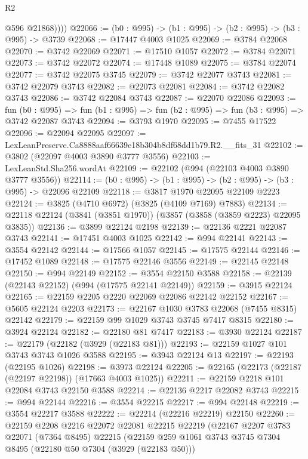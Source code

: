 \begin{lexlean}{R2}
\begin{coremodule}
            @596
            @21868))))
@22066 := (b0 : @995) -> (b1 : @995) -> (b2 : @995) -> (b3 : @995) -> @3739
@22068 := @17447 @4003 @1025
@22069 := @3784 @22068
@22070 := @3742 @22069
@22071 := @17510 @1057
@22072 := @3784 @22071
@22073 := @3742 @22072
@22074 := @17448 @1089
@22075 := @3784 @22074
@22077 := @3742 @22075 @3745
@22079 := @3742 @22077 @3743
@22081 := @3742 @22079 @3743
@22082 := @22073 @22081
@22084 := @3742 @22082 @3743
@22086 := @3742 @22084 @3743
@22087 := @22070 @22086
@22093 := fun (b0 : @995) =>
  fun (b1 : @995) => fun (b2 : @995) => fun (b3 : @995) => @3742 @22087 @3743
@22094 := @3793 @1970
@22095 := @7455 @17522
@22096 := @22094 @22095
@22097 := LexLeanPreserve.Ca8888aaf66639e18b304b8df68dd1b79.R2.__fits_31
@22102 := @3802 (@22097 @4003 @3890 @3777 @3556)
@22103 := LexLeanStd.Sha256.wordAt
@22109 := @22102 (@994 (@22103 @4003 @3890 @3777 @3556))
@22114 := (b0 : @995) -> (b1 : @995) -> (b2 : @995) -> (b3 : @995) -> @22096 @22109
@22118 := @3817 @1970 @22095 @22109 @2223
@22124 := @3825 (@4710 @6972) (@3825 (@4109 @7169) @7883)
@22134 := @22118 @22124 (@3841 (@3851 @1970)) (@3857 (@3858 (@3859 @2223) @22095 @3835))
@22136 := @3899 @22124 @2198
@22139 := @22136 @2221 @22087 @3743
@22141 := @17451 @4003 @1025
@22142 := @994 @22141
@22143 := @3554 @22142
@22144 := @17566 @1057
@22145 := @17575 @22144
@22146 := @17452 @1089
@22148 := @17575 @22146 @3556
@22149 := @22145 @22148
@22150 := @994 @22149
@22152 := @3554 @22150 @3588
@22158 := @22139 (@22143 @22152) (@994 (@17575 @22141 @22149))
@22159 := @3915 @22124
@22165 := @22159 @2205 @2220 @22069 @22086 @22142 @22152
@22167 := @5605 @22124 @2203
@22173 := @22167 @1030 @3783 @22068 (@7455 @8315) @22142
@22179 := @22159 @99 @1029 @3743 @3745 @7417 @8315
@22180 := @3924 @22124
@22182 := @22180 @81 @7417
@22183 := @3930 @22124
@22187 := @22179 (@22182 (@3929 (@22183 @81)))
@22193 := @22159 @1027 @101 @3743 @3743 @1026 @3588
@22195 := @3943 @22124 @13
@22197 := @22193 (@22195 @1026)
@22198 := @3973 @22124
@22205 := @22165 (@22173 (@22187 (@22197 @22198)) (@17663 @4003 @1025))
@22211 := @22159 @2218 @101 @22084 @3743 @22150 @3588
@22214 := @22136 @2217 @22082 @3743
@22215 := @994 @22144
@22216 := @3554 @22215
@22217 := @994 @22148
@22219 := @3554 @22217 @3588
@22222 := @22214 (@22216 @22219) @22150
@22260 := @22159
    @2208
    @2216
    @22072
    @22081
    @22215
    @22219
    (@22167
      @2207
      @3783
      @22071
      (@7364 @8495)
      @22215
      (@22159
        @259
        @1061
        @3743
        @3745
        @7304
        @8495
        (@22180 @50 @7304 (@3929 (@22183 @50)))

\end{coremodule}
\end{lexlean}
